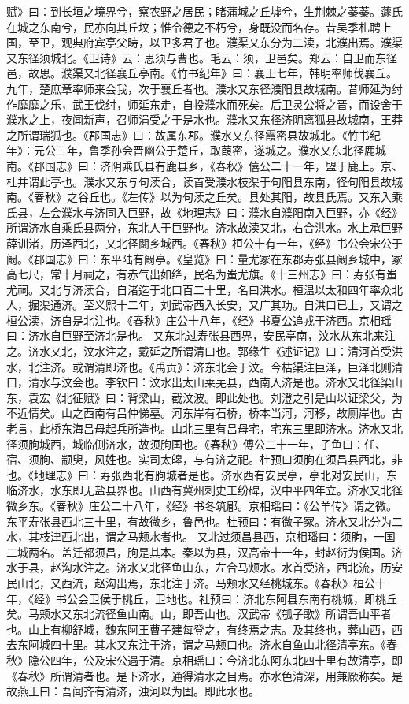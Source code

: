 \documentclass[12pt,UTF8]{ctexbook}
\begin{document}
赋》曰：到长垣之境界兮，察农野之居民；睹蒲城之丘墟兮，生荆棘之蓁蓁。蘧氏在城之东南兮，民亦向其丘坟；惟令德之不朽兮，身既没而名存。昔吴季札聘上国，至卫，观典府宾亭父畴，以卫多君子也。濮渠又东分为二渎，北濮出焉。濮渠又东径须城北。《卫诗》云：思须与曹也。毛云：须，卫邑矣。郑云：自卫而东径邑，故思。濮渠又北径襄丘亭南。《竹书纪年》曰：襄王七年，韩明率师伐襄丘。九年，楚庶章率师来会我，次于襄丘者也。濮水又东径濮阳县故城南。昔师延为纣作靡靡之乐，武王伐纣，师延东走，自投濮水而死矣。后卫灵公将之晋，而设舍于濮水之上，夜闻新声，召师涓受之于是水也。濮水又东径济阴离狐县故城南，王莽之所谓瑞狐也。《郡国志》曰：故属东郡。濮水又东径霞密县故城北。《竹书纪年》：元公三年，鲁季孙会晋幽公于楚丘，取葭密，遂城之。濮水又东北径鹿城南。《郡国志》曰：济阴乘氏县有鹿县乡，《春秋》僖公二十一年，盟于鹿上。京、杜并谓此亭也。濮水又东与句渎合，读首受濮水枝渠于句阳县东南，径句阳县故城南。《春秋》之谷丘也。《左传》以为句渎之丘矣。县处其阳，故县氏焉。又东入乘氏县，左会濮水与济同入巨野，故《地理志》曰：濮水自濮阳南入巨野，亦《经》所谓济水自乘氏县两分，东北人于巨野也。济水故渎又北，右合洪水。水上承巨野薛训渚，历泽西北，又北径闞乡城西。《春秋》桓公十有一年，《经》书公会宋公于阚。《郡国志》曰：东平陆有阚亭。《皇览》曰：量尤冢在东郡寿张县阚乡城中，冢高七尺，常十月祠之，有赤气出如绛，民名为蚩尤旗。《十三州志》曰：寿张有蚩尤祠。又北与济渎合，自渚迄于北口百二十里，名曰洪水。桓温以太和四年率众北人，掘渠通济。至义熙十二年，刘武帝西入长安，又广其功。自洪口已上，又谓之桓公渎，济自是北注也。《春秋》庄公十八年，《经》书夏公追戎于济西。京相瑶曰：济水自巨野至济北是也。
又东北过寿张县西界，安民亭南，汶水从东北来注之。济水又北，汶水注之，戴延之所谓清口也。郭缘生《述证记》曰：清河首受洪水，北注济。或谓清即济也。《禹贡》：济东北会于汶。今枯渠注巨泽，巨泽北则清口，清水与汶会也。李钦曰：汶水出太山莱芜县，西南入济是也。济水又北径梁山东，袁宏《北征赋》曰：背梁山，截汶波。即此处也。刘澄之引是山以证梁父，为不近情矣。山之西南有吕仲悌墓。河东岸有石桥，桥本当河，河移，故厕岸也。古老言，此桥东海吕母起兵所造也。山北三里有吕母宅，宅东三里即济水。济水又北径须朐城西，城临侧济水，故须朐国也。《春秋》傅公二十一年，子鱼曰：任、宿、须朐、颛臾，风姓也。实司太皞，与有济之祀。杜预曰须朐在须昌县西北，非也。《地理志》曰：寿张西北有朐城者是也。济水西有安民亭，亭北对安民山，东临济水，水东即无盐县界也。山西有冀州刺史工纷碑，汉中平四年立。济水又北径微乡东。《春秋》庄公二十八年，《经》书冬筑郿。京相瑶曰：《公羊传》谓之微。东平寿张县西北三十里，有故微乡，鲁邑也。杜预曰：有微子冢。济水又北分为二水，其枝津西北出，谓之马颊水者也。
又北过须昌县西，京相璠曰：须朐，一国二城两名。盖迁都须昌，朐是其本。秦以为县，汉高帝十一年，封赵衍为侯国。济水于县，赵沟水注之。济水又北径鱼山东，左合马颊水。水首受济，西北流，历安民山北，又西流，赵沟出焉，东北注于济。马颊水又经桃城东。《春秋》桓公十年，《经》书公会卫侯于桃丘，卫地也。社预曰：济北东阿县东南有桃城，即桃丘矣。马颊水又东北流径鱼山南。山，即吾山也。汉武帝《瓠子歌》所谓吾山平者也。山上有柳舒城，魏东阿王曹子建每登之，有终焉之志。及其终也，葬山西，西去东阿城四十里。其水又东注于济，谓之马颊口也。济水自鱼山北径清亭东。《春秋》隐公四年，公及宋公遇于清。京相瑶曰：今济北东阿东北四十里有故清亭，即《春秋》所谓清者也。是下济水，通得清水之目焉。亦水色清深，用兼厥称矣。是故燕王曰：吾闻齐有清济，浊河以为固。即此水也。
\end{document}
